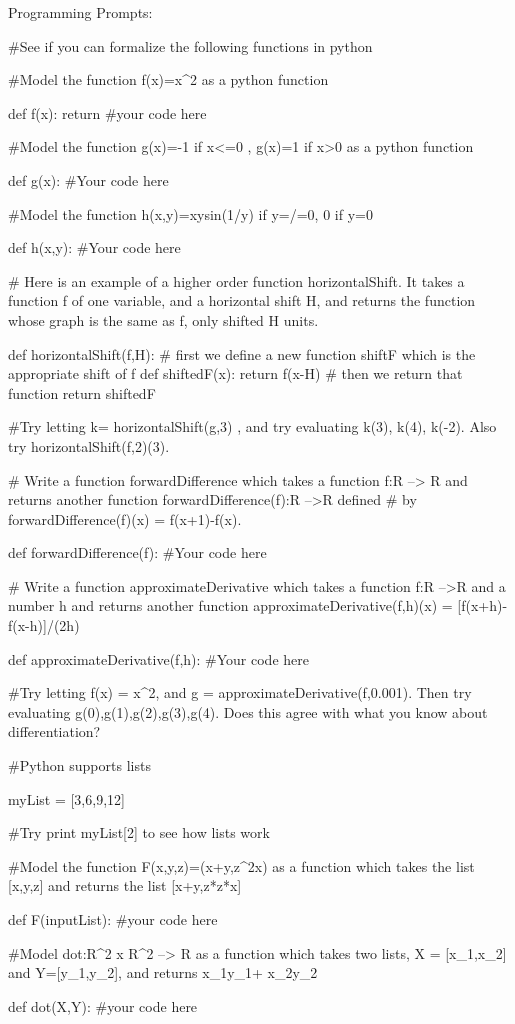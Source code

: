 \documentclass{ximera}
\begin{document}
Programming Prompts:

#See if you can formalize the following functions in python

#Model the function f(x)=x^2 as a python function

def f(x):
	return #your code here
	
#Model the function g(x)=-1 if x<=0 , g(x)=1 if x>0 as a python function

def g(x):
	#Your code here
	
#Model the function h(x,y)=xysin(1/y) if y=/=0, 0 if y=0

def h(x,y):
	#Your code here
	
# Here is an example of a higher order function horizontalShift.  It takes a function f of one variable, and a horizontal shift H, and returns the function whose graph is the same as f, only shifted H units.

def horizontalShift(f,H):
	# first we define a new function shiftF which is the appropriate shift of f
	def shiftedF(x):  
		return f(x-H) 
	# then we return that function
	return shiftedF

#Try  letting  k= horizontalShift(g,3) 	, and try evaluating k(3), k(4), k(-2).  Also try horizontalShift(f,2)(3).

# Write a function forwardDifference which takes a function f:R --> R and returns another function forwardDifference(f):R -->R defined 
# by forwardDifference(f)(x) = f(x+1)-f(x).

def forwardDifference(f):
	#Your code here
	
# Write a function approximateDerivative which takes a function f:R -->R  and a number h and returns another function approximateDerivative(f,h)(x) = [f(x+h)-f(x-h)]/(2h)

def approximateDerivative(f,h):
	#Your code here
	
#Try letting f(x) = x^2, and g = approximateDerivative(f,0.001).  Then try evaluating g(0),g(1),g(2),g(3),g(4).  Does this agree with what you know about differentiation?

#Python supports lists

	myList = [3,6,9,12]

#Try print myList[2] to see how lists work

#Model the function F(x,y,z)=(x+y,z^2x) as a function which takes the list [x,y,z] and returns the list [x+y,z*z*x]

def F(inputList):
	#your code here
	
#Model dot:R^2 x R^2 --> R as a function which takes two lists, X = [x_1,x_2] and Y=[y_1,y_2], and returns x_1y_1+ x_2y_2

def dot(X,Y):
	#your code here
	
\end{document}
